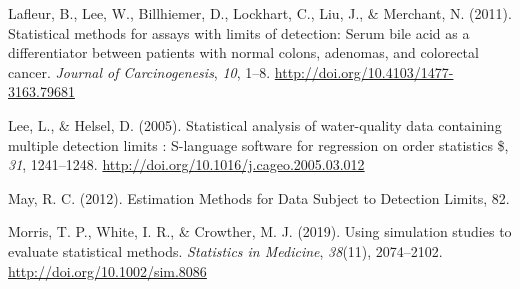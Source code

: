 \documentclass[12pt, twoside]{amherstthesis}
\newlength{\cslhangindent}
\newenvironment{cslreferences}%
  {\setlength{\parindent}{0pt}%
  \everypar{\setlength{\hangindent}{\cslhangindent}}\ignorespaces}%
  {\par}
\begin{document}
\begin{cslreferences}
\leavevmode\hypertarget{ref-Lafleur2011}{}%
Lafleur, B., Lee, W., Billhiemer, D., Lockhart, C., Liu, J., \& Merchant, N. (2011). Statistical methods for assays with limits of detection: Serum bile acid as a differentiator between patients with normal colons, adenomas, and colorectal cancer. \emph{Journal of Carcinogenesis}, \emph{10}, 1--8. \url{http://doi.org/10.4103/1477-3163.79681}

\leavevmode\hypertarget{ref-Lee2005}{}%
Lee, L., \& Helsel, D. (2005). Statistical analysis of water-quality data containing multiple detection limits : S-language software for regression on order statistics \$, \emph{31}, 1241--1248. \url{http://doi.org/10.1016/j.cageo.2005.03.012}

\leavevmode\hypertarget{ref-May2012}{}%
May, R. C. (2012). Estimation Methods for Data Subject to Detection Limits, 82.

\leavevmode\hypertarget{ref-Morris2019}{}%
Morris, T. P., White, I. R., \& Crowther, M. J. (2019). Using simulation studies to evaluate statistical methods. \emph{Statistics in Medicine}, \emph{38}(11), 2074--2102. \url{http://doi.org/10.1002/sim.8086}
\end{cslreferences}
\end{document}
